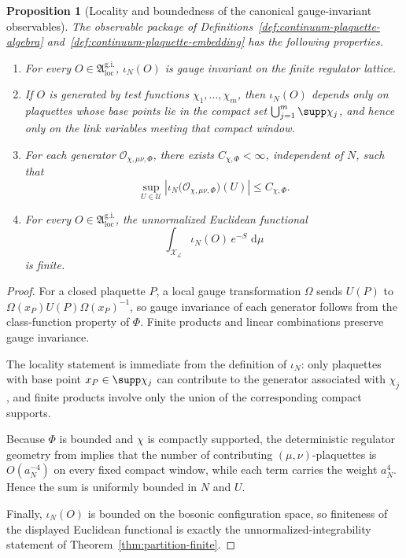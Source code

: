 \documentclass[11pt]{article}
\newtheorem{proposition}[theorem]{Proposition}
\theoremstyle{remark}
\newcommand{\mcU}{\mathscr U}
\newcommand{\mcX}{\mathscr X}
\newcommand{\dd}{\,\mathrm d}
\begin{document}
\begin{proposition}[Locality and boundedness of the canonical gauge-invariant observables]
\label{prop:continuum-plaquette-package}
The observable package of
Definitions~\ref{def:continuum-plaquette-algebra}
and~\ref{def:continuum-plaquette-embedding} has the following properties.
\begin{enumerate}[leftmargin=1.5em]
\item For every \(O\in\mathfrak A_{\mathrm{loc}}^{\mathrm{g.i.}}\),
\(\iota_N(O)\) is gauge invariant on the finite regulator lattice.
\item If \(O\) is generated by test functions \(\chi_1,\dots,\chi_m\), then
\(\iota_N(O)\) depends only on plaquettes whose base points lie in the compact
set \(\bigcup_{j=1}^m\supp\chi_j\), and hence only on the link variables
meeting that compact window.
\item For each generator \(\mathcal O_{\chi,\mu\nu,\Phi}\), there exists
\(C_{\chi,\Phi}<\infty\), independent of \(N\), such that
\[
\sup_{U\in\mcU}
\left|
\iota_N\bigl(\mathcal O_{\chi,\mu\nu,\Phi}\bigr)(U)
\right|
\le
C_{\chi,\Phi}.
\]
\item For every \(O\in\mathfrak A_{\mathrm{loc}}^{\mathrm{g.i.}}\), the
unnormalized Euclidean functional
\[
\int_{\mcX_\mathcal L}\iota_N(O)\,e^{-S}\,\dd\mu
\]
is finite.
\end{enumerate}
\end{proposition}

\begin{proof}
For a closed plaquette \(P\), a local gauge transformation
\(\Omega\) sends \(U(P)\) to \(\Omega(x_P)U(P)\Omega(x_P)^{-1}\), so gauge
invariance of each generator follows from the class-function property of
\(\Phi\).  Finite products and linear combinations preserve gauge invariance.

The locality statement is immediate from the definition of \(\iota_N\): only
plaquettes with base point \(x_P\in\supp\chi_j\) can contribute to the generator
associated with \(\chi_j\), and finite products involve only the union of the
corresponding compact supports.

Because \(\Phi\) is bounded and \(\chi\) is compactly supported, the
deterministic regulator geometry from \cite{continuumqft} implies that the
number of contributing \((\mu,\nu)\)-plaquettes is \(O(a_N^{-4})\) on every
fixed compact window, while each term carries the weight \(a_N^4\).  Hence the
sum is uniformly bounded in \(N\) and \(U\).

Finally, \(\iota_N(O)\) is bounded on the bosonic configuration space, so
finiteness of the displayed Euclidean functional is exactly the
unnormalized-integrability statement of
Theorem~\ref{thm:partition-finite}.
\end{proof}
\end{document}
